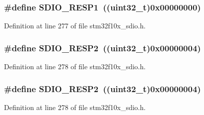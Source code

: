 \subsubsection[{\texorpdfstring{S\+D\+I\+O\+\_\+\+R\+E\+S\+P1}{SDIO_RESP1}}]{\setlength{\rightskip}{0pt plus 5cm}\#define S\+D\+I\+O\+\_\+\+R\+E\+S\+P1~(({\bf uint32\+\_\+t})0x00000000)}\hypertarget{group___s_d_i_o___response___registers_ga9d78943952cf0e36736313d949520a2d}{}\label{group___s_d_i_o___response___registers_ga9d78943952cf0e36736313d949520a2d}


Definition at line 277 of file stm32f10x\+\_\+sdio.\+h.

\subsubsection[{\texorpdfstring{S\+D\+I\+O\+\_\+\+R\+E\+S\+P2}{SDIO_RESP2}}]{\setlength{\rightskip}{0pt plus 5cm}\#define S\+D\+I\+O\+\_\+\+R\+E\+S\+P2~(({\bf uint32\+\_\+t})0x00000004)}\hypertarget{group___s_d_i_o___response___registers_gabd551272af4161844b5358fd3c3c379c}{}\label{group___s_d_i_o___response___registers_gabd551272af4161844b5358fd3c3c379c}


Definition at line 278 of file stm32f10x\+\_\+sdio.\+h.

\subsubsection[{\texorpdfstring{S\+D\+I\+O\+\_\+\+R\+E\+S\+P2}{SDIO_RESP2}}]{\setlength{\rightskip}{0pt plus 5cm}\#define S\+D\+I\+O\+\_\+\+R\+E\+S\+P2~(({\bf uint32\+\_\+t})0x00000004)}\hypertarget{group___s_d_i_o___response___registers_gabd551272af4161844b5358fd3c3c379c}{}\label{group___s_d_i_o___response___registers_gabd551272af4161844b5358fd3c3c379c}


Definition at line 278 of file stm32f10x\+\_\+sdio.\+h.

